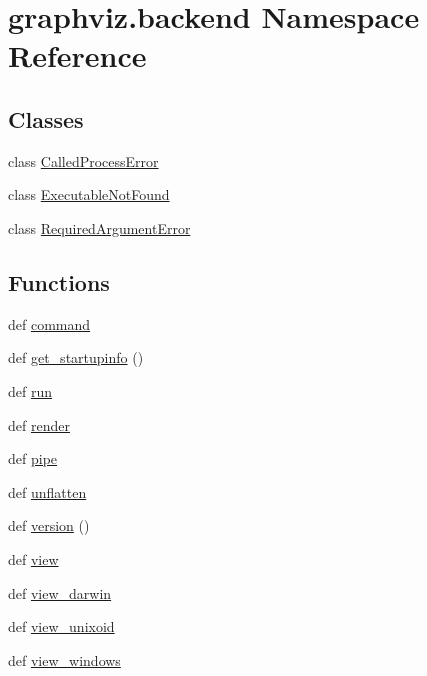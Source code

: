\hypertarget{namespacegraphviz_1_1backend}{}\section{graphviz.\+backend Namespace Reference}
\label{namespacegraphviz_1_1backend}
\subsection*{Classes}
\begin{DoxyCompactItemize}
\item 
class \hyperlink{classgraphviz_1_1backend_1_1CalledProcessError}{Called\+Process\+Error}
\item 
class \hyperlink{classgraphviz_1_1backend_1_1ExecutableNotFound}{Executable\+Not\+Found}
\item 
class \hyperlink{classgraphviz_1_1backend_1_1RequiredArgumentError}{Required\+Argument\+Error}
\end{DoxyCompactItemize}
\subsection*{Functions}
\begin{DoxyCompactItemize}
\item 
def \hyperlink{namespacegraphviz_1_1backend_a86178c80a9e749c977ab49783cc391d8}{command}
\item 
def \hyperlink{namespacegraphviz_1_1backend_a6ce9f12deeddd6800e99eb28917c0694}{get\+\_\+startupinfo} ()
\item 
def \hyperlink{namespacegraphviz_1_1backend_ad0353ed739611eea5924f8af4b3a3618}{run}
\item 
def \hyperlink{namespacegraphviz_1_1backend_a55b58f5b91d47863d02f536d4b883a23}{render}
\item 
def \hyperlink{namespacegraphviz_1_1backend_ac97a4806e0f00ac9af2a14434af13bed}{pipe}
\item 
def \hyperlink{namespacegraphviz_1_1backend_ae10adeb73d6d33c09857d5b5e0fb0ede}{unflatten}
\item 
def \hyperlink{namespacegraphviz_1_1backend_ac098062fcef1b6bb74f4a4fff2f064bf}{version} ()
\item 
def \hyperlink{namespacegraphviz_1_1backend_a72d0d5c4b883d45119cd0044f18adbb1}{view}
\item 
def \hyperlink{namespacegraphviz_1_1backend_a498c99db93eb0697bdcace197fb8c429}{view\+\_\+darwin}
\item 
def \hyperlink{namespacegraphviz_1_1backend_a9d75d1ee28b04b876f40dd7d3a700391}{view\+\_\+unixoid}
\item 
def \hyperlink{namespacegraphviz_1_1backend_a6fb956ad5a3edba967d1e372acce0589}{view\+\_\+windows}
\end{DoxyCompactItemize}

